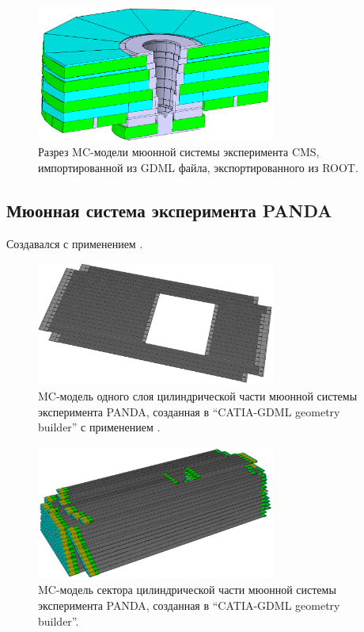 
\begin{figure}[H]
\centering
\includegraphics[width=0.7\textwidth]{pictures/CMS_MUON.png}
\caption{Разрез MC-модели мюонной системы эксперимента CMS, импортированной из GDML файла, экспортированного из ROOT.}
\label{fig:CmsMuon}
\end{figure}

\subsection{Мюонная система эксперимента PANDA}\label{sec:secPandaMuon}

Создавался с применением .

\begin{figure}[H]
\centering
\includegraphics[width=0.7\textwidth]{pictures/PANDA_layer.png}
\caption{MC-модель одного слоя цилиндрической части мюонной системы эксперимента PANDA, созданная в ``CATIA-GDML geometry builder'' с применением .}
\label{fig:PandaMuonLayer}
\end{figure}

\begin{figure}[H]
\centering
\includegraphics[width=0.7\textwidth]{pictures/PANDA_MUCH_part.png}
\caption{MC-модель сектора цилиндрической части мюонной системы эксперимента PANDA, созданная в ``CATIA-GDML geometry builder''.}
\label{fig:PandaMuonPart}
\end{figure}

